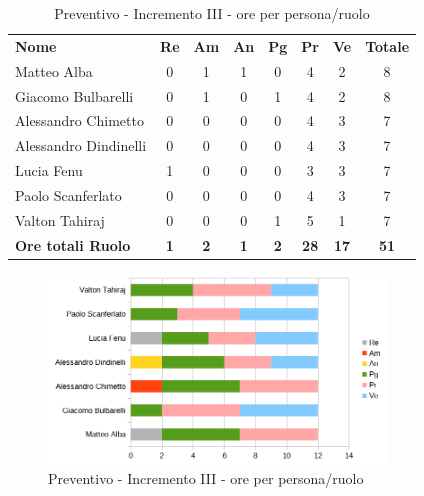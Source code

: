 \begin{table} [h!]
	\begin{center}
		\begin{tabular} { m{3.5cm} c c c c c c c }
			\rowcolor{lightgray}
			\textbf{Nome} & \textbf{Re} & \textbf{Am} & \textbf{An} & \textbf{Pg} & \textbf{Pr} & \textbf{Ve} & \textbf{Totale} \\
			Matteo Alba & 0 & 1 & 1 & 0 & 4 & 2 & 8 \\
			Giacomo Bulbarelli & 0 & 1 & 0 & 1 & 4 & 2 & 8 \\
			Alessandro Chimetto & 0 & 0 & 0 & 0 & 4 & 3 & 7 \\
			Alessandro Dindinelli & 0 & 0 & 0 & 0 & 4 & 3 & 7 \\
			Lucia Fenu & 1 & 0 & 0 & 0 & 3 & 3 & 7 \\
			Paolo Scanferlato & 0 & 0 & 0 & 0 & 4 & 3 & 7 \\
			Valton Tahiraj & 0 & 0 & 0 & 1 & 5 & 1 & 7 \\
			\textbf{Ore totali Ruolo} & \textbf{1} & \textbf{2} & \textbf{1} & \textbf{2} & \textbf{28}& \textbf{17} & \textbf{51}
		\end{tabular}
		\caption{Preventivo - Incremento III - ore per persona/ruolo}
	\end{center}
\end{table}
\begin{figure} [h!]
	\centering
	\includegraphics[width=0.8\textwidth]{res/img/preventivi/4e5-barre.png}
	\caption{Preventivo - Incremento III - ore per persona/ruolo} 
\end{figure}

\newpage

